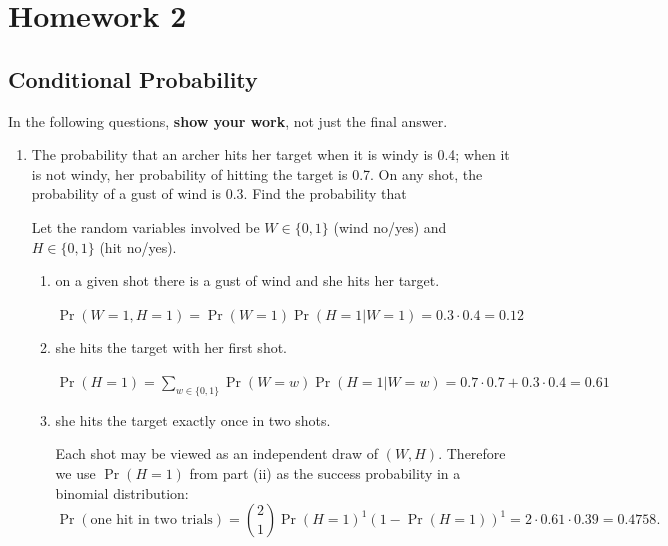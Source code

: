 \newcommand{\solution}{\textbf{Solution: }}
\renewcommand{\P}{\Pr}
\renewcommand{\hat}{\widehat}
\renewcommand{\N}{\mathcal{N}}
\newcommand{\Pbf}{\textbf{P}}
\renewcommand{\R}{\mathbb{R}}
\newcommand{\Var}{\text{Var}}
\newcommand{\Cov}{\text{Cov}}
\renewcommand{\mat}{\mathbf}

\section{Homework 2}
\subsection{Conditional Probability}
In the following questions, \textbf{show your work}, not just the final answer.
\begin{enumerate}[label=(\alph*)]
\item The probability that an archer hits her target when it is windy is 0.4;
  when it is not windy, her probability of hitting the target is 0.7. On any
  shot, the probability of a gust of wind is 0.3. Find the probability that
  \begin{mdframed}
    Let the random variables involved be $W \in \{0, 1\}$ (wind no/yes) and
    $H \in \{0, 1\}$ (hit no/yes).
  \end{mdframed}
    \begin{enumerate}[label=(\roman*)]
        \item on a given shot there is a gust of wind and she hits her target.
          \begin{mdframed}
            $
            \Pr(W=1, H=1) = \Pr(W=1)\Pr(H=1|W=1) = 0.3 \cdot 0.4 = 0.12
            $
          \end{mdframed}
        \item she hits the target with her first shot.
          \begin{mdframed}
            $
            \Pr(H=1) = \sum_{w \in \{0, 1\}} \Pr(W=w) \Pr(H=1|W=w) = 0.7 \cdot 0.7 + 0.3 \cdot 0.4 = 0.61
            $
          \end{mdframed}
        \item she hits the target exactly once in two shots.
          \begin{mdframed}
            Each shot may be viewed as an independent draw of $(W,
            H)$. Therefore we use $\Pr(H=1)$ from part (ii) as the success
            probability in a binomial distribution:
            $$
            \Pr(\text{one hit in two trials}) = {2 \choose 1} \Pr(H=1)^1 \left(1 - \Pr(H=1)\right)^1 = 2 \cdot 0.61 \cdot 0.39 = 0.4758.
$$
\end{mdframed}
\end{enumerate}
\end{enumerate}
